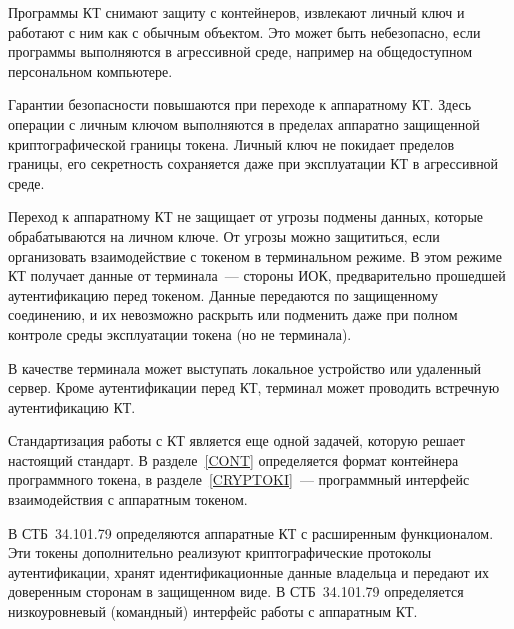 Программы КТ снимают защиту с контейнеров, извлекают личный ключ и работают с
ним как с обычным объектом. Это может быть небезопасно, если программы
выполняются в агрессивной среде, например на общедоступном персональном
компьютере.

Гарантии безопасности повышаются при переходе к аппаратному КТ. Здесь операции с
личным ключом выполняются в пределах аппаратно защищенной криптографической
границы токена. Личный ключ не покидает пределов границы, его секретность
сохраняется даже при эксплуатации КТ в агрессивной среде.

Переход к аппаратному КТ не защищает от угрозы подмены данных, которые
обрабатываются на личном ключе. От угрозы можно защититься, если организовать
взаимодействие с токеном в терминальном режиме. В этом режиме КТ получает данные
от терминала~--- стороны ИОК, предварительно прошедшей аутентификацию перед
токеном. Данные передаются по защищенному соединению, и их невозможно раскрыть
или подменить даже при полном контроле среды эксплуатации токена (но не
терминала).

В качестве терминала может выступать локальное устройство или удаленный сервер.
Кроме аутентификации перед КТ, терминал может проводить встречную
аутентификацию КТ.

Стандартизация работы с КТ является еще одной задачей, которую решает настоящий
стандарт. В разделе~\ref{CONT} определяется формат контейнера программного
токена, в разделе~\ref{CRYPTOKI}~--- программный интерфейс взаимодействия с
аппаратным токеном.

В СТБ~34.101.79 определяются аппаратные КТ с расширенным функционалом. Эти
токены дополнительно реализуют криптографические протоколы аутентификации,
хранят идентификационные данные владельца и передают их доверенным сторонам в
защищенном виде.
%
В СТБ~34.101.79 определяется низкоуровневый (командный) интерфейс работы с
аппаратным КТ.

